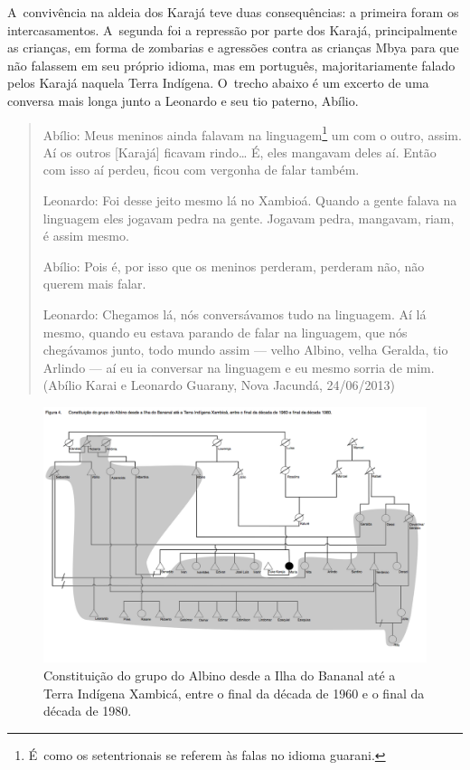 A~convivência na aldeia dos Karajá teve duas consequências: a primeira
foram os intercasamentos. A~segunda foi a repressão por parte dos
Karajá, principalmente as crianças, em forma de zombarias e agressões
contra as crianças Mbya para que não falassem em seu próprio idioma,
mas em português, majoritariamente falado pelos Karajá naquela Terra
Indígena. O~trecho abaixo é um excerto de uma conversa mais longa junto
a Leonardo e seu tio paterno, Abílio. 

\begin{quote}
\noindent
Abílio: Meus meninos ainda falavam na linguagem\footnote{É~como os
setentrionais se referem às falas no idioma guarani.} um com o outro,
assim. Aí os outros [Karajá] ficavam rindo\ldots{} É, eles mangavam deles
aí. Então com isso aí perdeu, ficou com vergonha de falar também.

Leonardo: Foi desse jeito mesmo lá no Xambioá. Quando a gente falava na
linguagem eles jogavam pedra na gente. Jogavam pedra, mangavam, riam, é
assim mesmo. 

Abílio: Pois é, por isso que os meninos perderam, perderam não, não
querem mais falar.

Leonardo: Chegamos lá, nós conversávamos tudo na linguagem. Aí lá mesmo,
quando eu estava parando de falar na linguagem, que nós chegávamos
junto, todo mundo assim --- velho Albino, velha Geralda, tio Arlindo --- aí
eu ia conversar na linguagem e eu mesmo sorria de mim. (Abílio Karai e
Leonardo Guarany, Nova Jacundá, 24/06/2013)
\end{quote}

\begin{figure}
  \centering
 \includegraphics[width=\textwidth]{./img/GUARANIS-img12.png}	
  \hfill
  \caption{Constituição do grupo do Albino desde a Ilha do Bananal até a Terra Indígena Xambicá, entre o final da década de 1960 e o final da década de 1980.}
\end{figure}
 

